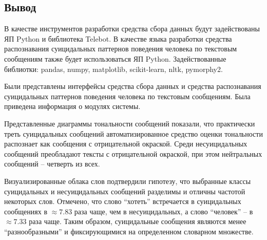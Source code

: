 \subsection*{Вывод}

В качестве инструментов разработки средства сбора данных будут задействованы ЯП Python и библиотека Telebot. 
В качестве языка разработки средства распознавания суицидальных паттернов поведения человека по текстовым сообщениям также будет использоваться ЯП Python. 
Задействованные библиотки: pandas, numpy, matplotlib, scikit-learn, nltk, pymorphy2.

Были представлены интерфейсы средства сбора данных и средства распознавания суицидальных паттернов поведения человека по текстовым сообщениям.
Была приведена информация о модулях системы.

Представленные диаграммы тональности сообщений показали, что практически треть суицидальных сообщений автоматизированное средство оценки тональности распознает как сообщения с отрицательной окраской. 
Среди несуицидальных сообщений преобладают тексты с отрицательной окраской, при этом нейтральных сообщений -- четверть из всех.

Визуализированные облака слов подтвердили гипотезу, что выбранные классы суицидальных и несуицидальных сообщений разделимы и отличны частотой некоторых слов. 
Отмечено, что слово ``хотеть'' встречается в суицидальных сообщениях в $\approx 7.83$ раза чаще, чем в несуицидальных, а слово ``человек'' -- в $\approx 7.33$ раза чаще. 
Таким образом, суицидальные сообщения являются менее ``разнообразными'' и фиксирующимися на определенном словарном множестве.
